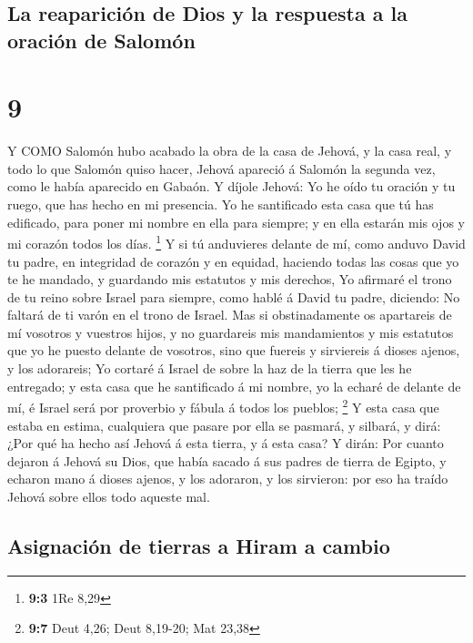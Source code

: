 \hypertarget{la-reapariciuxf3n-de-dios-y-la-respuesta-a-la-oraciuxf3n-de-salomuxf3n}{%
\subsection{La reaparición de Dios y la respuesta a la oración de
Salomón}\label{la-reapariciuxf3n-de-dios-y-la-respuesta-a-la-oraciuxf3n-de-salomuxf3n}}

\hypertarget{section-8}{%
\section{9}\label{section-8}}

 Y COMO Salomón hubo acabado la obra de la casa de Jehová, y
la casa real, y todo lo que Salomón quiso hacer,  Jehová
apareció á Salomón la segunda vez, como le había aparecido en Gabaón.
 Y díjole Jehová: Yo he oído tu oración y tu ruego, que has
hecho en mi presencia. Yo he santificado esta casa que tú has edificado,
para poner mi nombre en ella para siempre; y en ella estarán mis ojos y
mi corazón todos los días. \footnote{\textbf{9:3} 1Re 8,29} 
Y si tú anduvieres delante de mí, como anduvo David tu padre, en
integridad de corazón y en equidad, haciendo todas las cosas que yo te
he mandado, y guardando mis estatutos y mis derechos,  Yo
afirmaré el trono de tu reino sobre Israel para siempre, como hablé á
David tu padre, diciendo: No faltará de ti varón en el trono de Israel.
 Mas si obstinadamente os apartareis de mí vosotros y
vuestros hijos, y no guardareis mis mandamientos y mis estatutos que yo
he puesto delante de vosotros, sino que fuereis y sirviereis á dioses
ajenos, y los adorareis;  Yo cortaré á Israel de sobre la
haz de la tierra que les he entregado; y esta casa que he santificado á
mi nombre, yo la echaré de delante de mí, é Israel será por proverbio y
fábula á todos los pueblos; \footnote{\textbf{9:7} Deut 4,26; Deut
  8,19-20; Mat 23,38}  Y esta casa que estaba en estima,
cualquiera que pasare por ella se pasmará, y silbará, y dirá: ¿Por qué
ha hecho así Jehová á esta tierra, y á esta casa?  Y dirán:
Por cuanto dejaron á Jehová su Dios, que había sacado á sus padres de
tierra de Egipto, y echaron mano á dioses ajenos, y los adoraron, y los
sirvieron: por eso ha traído Jehová sobre ellos todo aqueste mal.

\hypertarget{asignaciuxf3n-de-tierras-a-hiram-a-cambio}{%
\subsection{Asignación de tierras a Hiram a
cambio}\label{asignaciuxf3n-de-tierras-a-hiram-a-cambio}}

